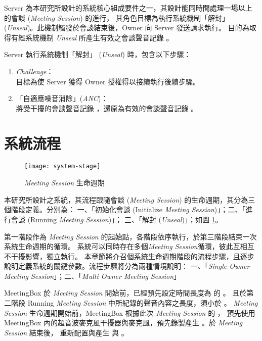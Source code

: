     Server 為本研究所設計的系統核心組成要件之一，其設計能同時間處理一場以上的會談 ({\it Meeting Session}) 的進行，
其角色目標為執行系統機制「解封」 ({\it Unseal})。此機制觸發於會談結束後，Owner 向 Server 發送請求執行。
目的為取得有經系統機制 {\it Unseal} 所產生有效之會談聲音記錄 \DEFrecREV。

    Server 執行系統機制「解封」 ({\it Unseal}) 時，包含以下步驟：
    \begin{enumerate}[itemsep=0pt,parsep=0pt,]
        \item {\it Challenge}： \\
            目標為使 Server 獲得 Owner 授權得以接續執行後續步驟。
        \item 「自適應噪音消除」({\it ANC})： \\
            將受干擾的會談聲音記錄 \DEFrecJ，還原為有效的會談聲音記錄 \DEFrecREV。
    \end{enumerate}


\section{系統流程}

\begin{figure}[H]
    \centering
    \texttt{[image: system-stage]}
    \caption{{\it Meeting Session} 生命週期}
    \label{fig:system-stage}
\end{figure}

    本研究所設計之系統，其流程跟隨會談 ({\it Meeting Session}) 的生命週期，其分為三個階段定義。分別為：
一、「初始化會談 (Initialize {\it Meeting Session})」；二、「進行會談 (Running {\it Meeting Session})」；
三、「解封 ({\it Unseal})」；如圖 \ref{fig:system-stage}。

    第一階段作為 {\it Meeting Session} 的起始點，各階段依序執行，於第三階段結束一次系統生命週期的循環。
系統可以同時存在多個{\it Meeting Session}循環，彼此互相互不干擾影響，獨立執行。
本章節將介召個系統生命週期階段的流程步驟，且逐步說明定義系統的關鍵參數。流程步驟將分為兩種情境說明：
一、「{\it Single Owner Meeting Session}」；二、「{\it Multi Owner Meeting Session}」

    MeetingBox 於 {\it Meeting Session} 開始前，已經預先設定時間長度為 \DEFtimeMAX 的 \DEFrecN。
且於第二階段 Running {\it Meeting Session} 中所紀錄的聲音內容之長度，須小於  \DEFtimeMAX。
{\it Meeting Session} 生命週期開始前，MeetingBox 根據此次 {\it Meeting Session} 的 \DEFseed，
預先使用 MeetingBox 內的超音波麥克風干擾器與麥克風，預先錄製產生 \DEFrecN。於 {\it Meeting Session} 結束後，
重新配置與產生 \DEFseed 與 \DEFrecN。


